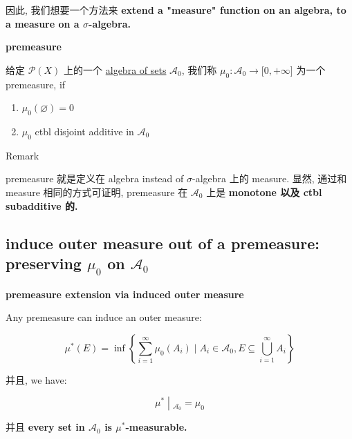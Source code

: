 \documentclass{qlnotes-export}
\begin{document}
因此, 我们想要一个方法来 \textbf{extend a "measure" function on an algebra, to a measure on a \(\sigma\)-algebra.}

\begin{definition}{\protect{}\label{kn-premeasure}{\textbf{premeasure}}}

给定 \(\mathcal{P}(X)\) 上的一个 \href{https://qiulinfan.github.io/notes/math/measure-theory/\#kn-algebra-of-sets}{algebra of sets} \(\mathcal{A}_{0}\), 我们称 \(\mu_{0}:\mathcal{A}_{0}\rightarrow\lbrack 0, + \infty\rbrack\) 为一个 premeasure, if

\begin{enumerate}
\item
  \(\mu_{0}(\varnothing) = 0\)
\item
  \(\mu_{0}\) ctbl disjoint additive in \(\mathcal{A}_{0}\)
\end{enumerate}

\end{definition}

\begin{qlremark}{Remark}

premeasure 就是定义在 algebra instead of \(\sigma\)-algebra 上的 measure. 显然, 通过和 measure 相同的方式可证明, premeasure 在 \(\mathcal{A}_{0}\) 上是 \textbf{monotone 以及 ctbl subadditive 的.}

\end{qlremark}

\subsection{\texorpdfstring{induce outer measure out of a premeasure: preserving \(\mu_{0}\) on \(\mathcal{A}_{0}\)}{induce outer measure out of a premeasure: preserving \textbackslash mu\_\{0\} on \textbackslash mathcal\{A\}\_\{0\}}}\label{induce-outer-measure-out-of-a-premeasure-preserving-mu_0-on-mathcala_0}

\begin{proposition}{\protect{}\label{kn-premeasure-extension-via-induced-outer-measure}{\textbf{premeasure
extension via induced outer measure}}}\label{prop-02-outer-measure-completion-of-a-measurable-space-proposition-001}

Any premeasure can induce an outer measure:

\[\mu^{\ast}(E) = \inf\left\{ {\sum\limits_{i = 1}^{\infty}\mu_{0}(A_{i}) \mid A_{i} \in \mathcal{A}_{0},E \subseteq \bigcup\limits_{i = 1}^{\infty}A_{i}} \right\}\]

并且, we have:

\[\left. \mu^{\ast} \middle| {}_{\mathcal{A}_{0}} = \mu_{0} \right.\]

并且 \textbf{every set in \(\mathcal{A}_{0}\) is \(\mu^{\ast}\)-measurable.}

\end{proposition}
\end{document}
